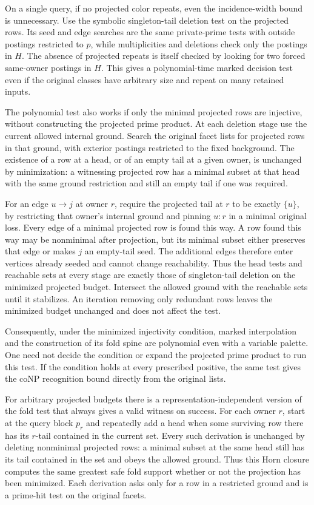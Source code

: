 On a single query, if no projected color repeats,
even the incidence-width bound is unnecessary.
Use the symbolic singleton-tail deletion test on
the projected rows. Its seed and edge searches
are the same private-prime tests with outside
postings restricted to $p$, while multiplicities
and deletions check only the postings in $H$.
The absence of projected repeats is itself checked
by looking for two forced same-owner postings in
$H$. This gives a polynomial-time marked decision
test even if the original classes have arbitrary
size and repeat on many retained inputs.

The polynomial test also works if only the
minimal projected rows are injective, without
constructing the projected prime product.
At each deletion stage use the current allowed
internal ground. Search the original facet lists
for projected rows in that ground, with exterior
postings restricted to the fixed background.
The existence of a row at a head, or of an
empty tail at a given owner, is unchanged by
minimization: a witnessing projected row has
a minimal subset at that head with the same
ground restriction and still an empty tail if
one was required.

For an edge $u\to j$ at owner $r$, require the
projected tail at $r$ to be exactly $\{u\}$, by
restricting that owner's internal ground and
pinning $u{:}r$ in a minimal original loss.
Every edge of a minimal projected row is
found this way. A row found this way may be
nonminimal after projection, but its minimal
subset either preserves that edge or makes
$j$ an empty-tail seed. The additional edges
therefore enter vertices already seeded and
cannot change reachability. Thus the head
tests and reachable sets at every stage are
exactly those of singleton-tail deletion on
the minimized projected budget. Intersect the
allowed ground with the reachable sets until
it stabilizes. An iteration removing only
redundant rows leaves the minimized budget
unchanged and does not affect the test.

Consequently, under the minimized injectivity
condition, marked interpolation and the
construction of its fold spine are polynomial
even with a variable palette. One need not
decide the condition or expand the projected
prime product to run this test. If the
condition holds at every prescribed positive,
the same test gives the coNP recognition
bound directly from the original lists.

For arbitrary projected budgets there is a
representation-independent version of the fold
test that always gives a valid witness on success.
For each owner $r$, start at the query block $p_r$
and repeatedly add a head when some surviving
row there has its $r$-tail contained in the current
set. Every such derivation is unchanged by deleting
nonminimal projected rows: a minimal subset at
the same head still has its tail contained in the
set and obeys the allowed ground. Thus this Horn
closure computes the same greatest safe fold
support whether or not the projection has been
minimized. Each derivation asks only for a row
in a restricted ground and is a prime-hit test
on the original facets.

